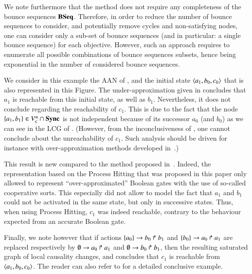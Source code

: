 We note furthermore that the method does not require any completeness of the bounce sequences
$\mathbf{BSeq}$.
Therefore, in order to reduce the number of bounce sequences to consider, and potentially remove
cycles and non-satisfying nodes,
one can consider only a sub-set of bounce sequences
(and in particular: a single bounce sequence) for each objective.
However, such an approach requires to enumerate all possible combinations of bounce sequences
subsets, hence being exponential in the number of considered bounce sequences.



\begin{example}
  We consider in this example the AAN of ,
  and the initial state $\mbox{$\langle a_1, b_0, c_0 \rangle$}$
  that is also represented in this Figure.
  The under-approximation given in 
  concludes that $a_1$ is reachable from this initial state, as well as $b_1$.
  Nevertheless, it does not conclude regarding the reachability of $c_1$.
  This is due to the fact that the node $\{ a_1, b_1 \} \in {V_\varsigma^u} \cap \mathbf{Sync}$
  is not independent because of its successor $a_0$ (and $b_0$)
  as we can see in the LCG of .
  (However, from the inconclusiveness of ,
  one cannot conclude about the unreachability of $c_1$.
  Such analysis should be driven for instance
  with over-approximation methods developed in~\cite{PMR12-MSCS}.)
  
  This result is new compared to the method proposed in~\cite{PMR12-MSCS}.
  Indeed, the representation based on the Process Hitting that was proposed
  in this paper only allowed to represent “over-approximated” Boolean gates
  with the use of so-called cooperative sorts.
  This especially did not allow to model the fact that $a_1$ and $b_1$ could not
  be activated in the same state, but only in successive states.
  Thus, when using Process Hitting, $c_1$ was indeed reachable,
  contrary to the behaviour expected from an accurate Boolean gate.
  
  Finally, we note however that
  if actions $\{a_0\}\rightarrow b_0\Rsh b_1$ and $\{b_0\}\rightarrow a_0\Rsh a_1$
  are replaced respectively by
  $\emptyset\rightarrow a_0\Rsh a_1$ and $\emptyset\rightarrow b_0\Rsh b_1$,
  then the resulting saturated graph of local causality changes, and
   concludes that $c_1$ is reachable from $\mbox{$\langle a_1, b_0, c_0 \rangle$}$.
  The reader can also refer to 
  for a detailed conclusive example.


\end{example}
